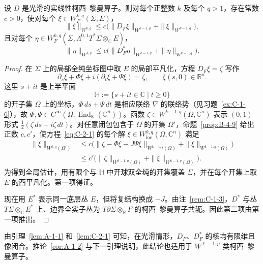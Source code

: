 \begin{lemma}\label{lem:C-2-1}
设 $D$ 是光滑的实线性柯西–黎曼算子。则对每个正整数 $k$ 及每个 $q>1$，存在常数 $c>0$，使对每个 $\xi\in W_F^{k,q}(\Sigma,E)$，
\[
  \|\xi\|_{W^{k,q}}\le c\bigl(\|D_F\xi\|_{W^{k-1,q}}+\|\xi\|_{W^{k-1,q}}\bigr),
\]
且对每个 $\eta\in W_F^{k,q}(\Sigma,\Lambda^{0,1}T^*\Sigma\otimes_{\mathbb C}E)$，
\[
  \|\eta\|_{W^{k,q}}\le c\bigl(\|D_F^*\eta\|_{W^{k-1,q}}+\|\eta\|_{W^{k-1,q}}\bigr).
\]
\end{lemma}
\begin{proof}
在 $\Sigma$ 上的局部全纯坐标图中取 $E$ 的局部平凡化，方程 $D_F\xi=\zeta$ 写作
\begin{equation}\label{eq:C-2-1}
  \partial_s\xi+\Phi\xi+i(\partial_t\xi+\Psi\xi)=\zeta,
  \qquad \xi(s,0)\in\mathbb R^n.
\end{equation}
这里 $s+it$ 是上半平面
\[
  \mathbb H:=\{s+it\in\mathbb C\mid t\ge0\}
\]
的开子集 $\Omega$ 上的坐标，$\Phi\,ds+\Psi\,dt$ 是相应联络 $\nabla$ 的联络势（见习题~\ref{ex:C-1-6}），故 $\Phi,\Psi\in C^\infty(\Omega,\operatorname{End}_{\mathbb R}(\mathbb C^n))$。函数 $\zeta\in W^{k-1,q}(\Omega,\mathbb C^n)$ 表示 $(0,1)$-形式 $\frac12(\zeta\,ds-i\zeta\,dt)$。对任意闭包包含于 $\Omega$ 的开集 $\Omega'$，命题~\ref{prop:B-4-9} 给出正数 $c,c'$，使方程~\eqref{eq:C-2-1} 的每个解 $\xi\in W^{k,q}_{\mathrm{loc}}(\Omega,\mathbb C^n)$ 满足
\[
\begin{aligned}
  \|\xi\|_{W^{k,q}(\Omega')}
  &\le c\bigl(\|\zeta-\Phi\xi-J\Psi\xi\|_{W^{k-1,q}(\Omega)}
                  +\|\xi\|_{W^{k-1,q}(\Omega)}\bigr)\\
  &\le c'\bigl(\|\zeta\|_{W^{k-1,q}(\Omega)}
                  +\|\xi\|_{W^{k-1,q}(\Omega)}\bigr).
\end{aligned}
\]
为得到全局估计，用有限个与 $\mathbb H$ 中开球双全纯的开集覆盖 $\Sigma$，并在每个开集上取 $E$ 的酉平凡化。第一项得证。

现在用 $E^*$ 表示同一底层丛 $E$，但将复结构换成 $-J$。由注~\ref{rem:C-1-3}，$D^*$ 与丛 $T\Sigma\otimes_{\mathbb C}E^*$ 上、边界全实子丛为 $T\partial\Sigma\otimes_{\mathbb R}F$ 的柯西–黎曼算子共轭。因此第二项由第一项推出。
\end{proof}

由引理~\ref{lem:A-1-1} 和~\ref{lem:C-2-1} 可知，在光滑情形，$D_F$、$D_F^*$ 的核均有限维且像闭合。推论~\ref{cor:A-1-2} 与下一引理说明，此结论也适用于 $W^{\ell-1,p}$ 类柯西–黎曼算子。

